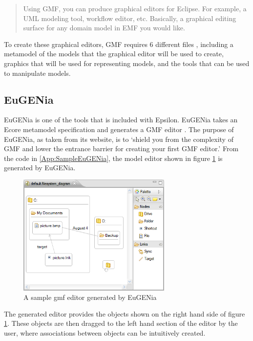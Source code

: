 \begin{quote} Using GMF, you can produce graphical editors for Eclipse. For example, a UML modeling tool, workflow editor, etc. Basically, a graphical editing surface for any domain model in EMF you would like. \end{quote}

To create these graphical editors, GMF requires 6 different files \citep{gmfIntro}, including a metamodel of the models that the graphical editor will be used to create, graphics that will be used for representing models, and the tools that can be used to manipulate models.

\subsection{EuGENia}
EuGENia is one of the tools that is included with Epsilon. EuGENia takes an Ecore metamodel specification and generates a GMF editor \citep{eugeniaSite}. The purpose of EuGENia, as taken from its website, is to `shield you from the complexity of GMF and lower the entrance barrier for creating your first GMF editor.' \citep{eugeniaSite} From the code in \ref{App:SampleEuGENia}, the model editor shown in figure \ref{sampleGmf} is generated by EuGENia.

\begin{figure}
\begin{center}
	\includegraphics[width=3in]{figures/gmfeditor.png}
\end{center}
\caption{A sample gmf editor generated by EuGENia \citep{eugeniaSite}}
\label{sampleGmf}
\end{figure}

The generated editor provides the objects shown on the right hand side of figure \ref{sampleGmf}. These objects are then dragged to the left hand section of the editor by the user, where associations between objects can be intuitively created.


